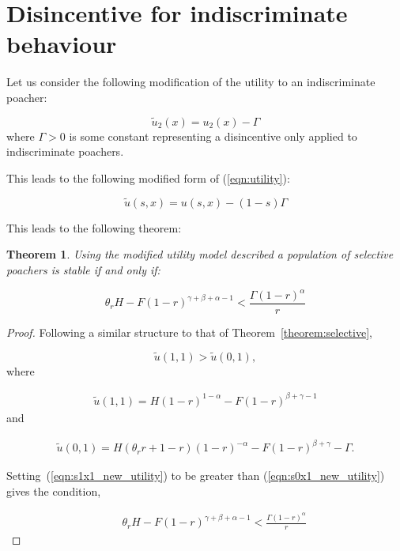 \documentclass[10pt]{article}
\newtheorem{theorem}{Theorem}
\begin{document}
\section{Disincentive for indiscriminate behaviour}

Let us consider the following modification of the utility to an indiscriminate
poacher:

\begin{equation}
    \label{eqn:modified_utility_for_ind}
    \tilde u_2(x) = u_2(x) - \Gamma
\end{equation}
where \(\Gamma>0\) is some constant representing a disincentive only applied to
indiscriminate poachers. 

This leads to the following modified form of (\ref{eqn:utility}):

\begin{equation}
    \label{eqn:modified_utility}
    \tilde u(s, x) = u(s, x) - (1 - s) \Gamma
\end{equation}

This leads to the following theorem:

\begin{theorem}\label{theorem:selective_new_utility}
Using the modified utility model described
a population of selective poachers is stable if and only if:

\begin{equation}\label{eq:selective_condition_new_utility}
\theta_r H -  F(1 -r) ^{\gamma + \beta + \alpha -1} < \frac{\Gamma (1- r) ^ {\alpha}}{r}
\end{equation}

\end{theorem}

\begin{proof}
    Following a similar structure to that of Theorem~\ref{theorem:selective},

    \begin{equation}
    \tilde{u}(1,1) > \tilde{u}(0,1),
    \end{equation}
    where
    
    \begin{eqnarray}
    \label{eqn:s1x1_new_utility}
    \tilde{u}(1,1) = H(1 - r)^{1 - \alpha} - F(1 - r)^{\beta + \gamma - 1}
    \end{eqnarray}
    and 
    
    \begin{eqnarray}
    \label{eqn:s0x1_new_utility}
    \tilde{u}(0,1) = H(\theta_r r +1 - r)(1 - r)^{-\alpha} - F(1 - r)^{\beta + \gamma} - \Gamma.
    \end{eqnarray}

    Setting~(\ref{eqn:s1x1_new_utility}) to be greater than (\ref{eqn:s0x1_new_utility})
    gives the condition,

    \begin{eqnarray}
    \label{eqn:s1x1_s0x1_new_utility}
    &&\theta_r H -  F(1 -r) ^{\gamma + \beta + \alpha -1} < \frac{\Gamma (1- r) ^ {\alpha}}{r}
    \end{eqnarray} 
\end{proof}
\end{document}
